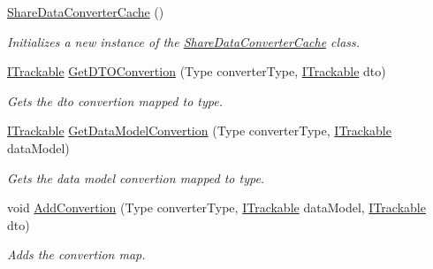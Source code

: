 \begin{DoxyCompactItemize}
\item 
\mbox{\hyperlink{class_bar_none_1_1_shared_1_1_data_converter_1_1_core_1_1_share_data_converter_cache_aa6b15c911425dad6e0912ecf841248f4}{Share\+Data\+Converter\+Cache}} ()
\begin{DoxyCompactList}\small\item\em Initializes a new instance of the \mbox{\hyperlink{class_bar_none_1_1_shared_1_1_data_converter_1_1_core_1_1_share_data_converter_cache}{Share\+Data\+Converter\+Cache}} class. \end{DoxyCompactList}\item 
\mbox{\hyperlink{interface_bar_none_1_1_shared_1_1_core_1_1_i_trackable}{I\+Trackable}} \mbox{\hyperlink{class_bar_none_1_1_shared_1_1_data_converter_1_1_core_1_1_share_data_converter_cache_ab364147cf9d15c389fa88788e8b937e9}{Get\+D\+T\+O\+Convertion}} (Type converter\+Type, \mbox{\hyperlink{interface_bar_none_1_1_shared_1_1_core_1_1_i_trackable}{I\+Trackable}} dto)
\begin{DoxyCompactList}\small\item\em Gets the dto convertion mapped to type. \end{DoxyCompactList}\item 
\mbox{\hyperlink{interface_bar_none_1_1_shared_1_1_core_1_1_i_trackable}{I\+Trackable}} \mbox{\hyperlink{class_bar_none_1_1_shared_1_1_data_converter_1_1_core_1_1_share_data_converter_cache_afd272410464c885fa4b3dcedf6aa1b67}{Get\+Data\+Model\+Convertion}} (Type converter\+Type, \mbox{\hyperlink{interface_bar_none_1_1_shared_1_1_core_1_1_i_trackable}{I\+Trackable}} data\+Model)
\begin{DoxyCompactList}\small\item\em Gets the data model convertion mapped to type. \end{DoxyCompactList}\item 
void \mbox{\hyperlink{class_bar_none_1_1_shared_1_1_data_converter_1_1_core_1_1_share_data_converter_cache_af3cc3b62d4db53afe65f31a5721dd41f}{Add\+Convertion}} (Type converter\+Type, \mbox{\hyperlink{interface_bar_none_1_1_shared_1_1_core_1_1_i_trackable}{I\+Trackable}} data\+Model, \mbox{\hyperlink{interface_bar_none_1_1_shared_1_1_core_1_1_i_trackable}{I\+Trackable}} dto)
\begin{DoxyCompactList}\small\item\em Adds the convertion map. \end{DoxyCompactList}\end{DoxyCompactItemize}
